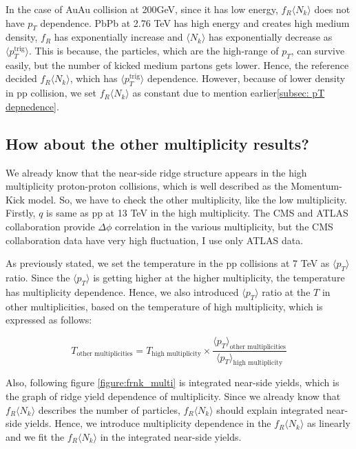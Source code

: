 \documentclass[jkps,fleqn,showpacs,showkeys]{revtex4}
\begin{document}
In the case of AuAu collision at 200GeV, since it has low energy, $f_R \langle N_k \rangle$ does not have $p_T$ dependence.
PbPb at 2.76 TeV has high energy and creates high medium density, $f_R$ has exponentially increase and $\langle N_k \rangle$ has exponentially decrease as $\langle p_T^{\text{trig}} \rangle$.
This is because, the particles, which are the high-range of $p_T$, can survive easily, but the number of kicked medium partons gets lower.
Hence, the reference\cite{PbPb} decided $f_R \langle N_k \rangle$, which has $\langle p_T^{\text{trig}} \rangle$ dependence.
However, because of lower density in pp collision, we set $f_R \langle N_k \rangle$ as constant due to mention earlier\ref{subsec: pT depnedence}.

\subsection{How about the other multiplicity results?}
\label{subsec: How about the other multiplicity results?}

We already know that the near-side ridge structure appears in the high multiplicity proton-proton collisions, which is well described as the Momentum-Kick model.
So, we have to check the other multiplicity, like the low multiplicity.
Firstly, $q$ is same as pp at 13 TeV in the high multiplicity.
The CMS and ATLAS collaboration provide $\Delta \phi$ correlation in the various multiplicity, but the CMS collaboration data have very high fluctuation, I use only ATLAS data.

As previously stated, we set the temperature in the pp collisions at 7 TeV as $\langle p_T \rangle$ ratio.
Since the $\langle p_T \rangle$ is getting higher at the higher multiplicity\cite{ATLAS:2016zkp}, the temperature has multiplicity dependence.
Hence, we also introduced $\langle p_T \rangle$ ratio at the $T$ in other multiplicities, based on the temperature of high multiplicity, which is expressed as follows:

\begin{equation} \label{equation:variousmulti}
  T_{\text{other multiplicities}} = T_{\text{high multiplicity}} \times \frac{\langle p_T \rangle_{\text{other multiplicities}}}{\langle p_T \rangle_{\text{high multiplicity}}}
\end{equation}

Also, following figure \ref{figure:frnk_multi} is integrated near-side yields, which is the graph of ridge yield dependence of multiplicity.
Since we already know that $f_R \langle N_k \rangle$ describes the number of particles, $f_R \langle N_k \rangle$ should explain integrated near-side yields.
Hence, we introduce multiplicity dependence in the $f_R \langle N_k \rangle$ as linearly and we fit the $f_R \langle N_k \rangle$ in the integrated near-side yields.
\end{document}
